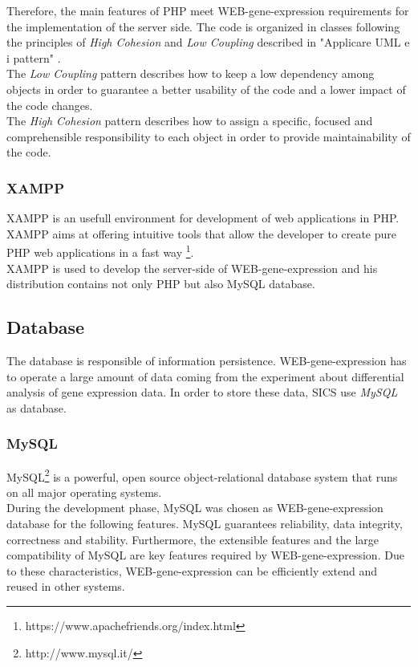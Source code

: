 \documentclass[a4paper]{report}
\begin{document}
Therefore, the main features of PHP meet WEB-gene-expression requirements for the implementation of the server side. The code is organized in classes following the principles of \emph{High Cohesion} and \emph{Low Coupling} described in "Applicare UML e i pattern" \cite{Craig Larman, Luca Cabibbo} . \\
The \emph{Low Coupling} pattern describes how to keep a low dependency among objects in order to guarantee a better usability of the code and a lower impact of the code changes.\\
The \emph{High Cohesion} pattern describes how to assign a specific, focused and comprehensible responsibility to each object in order to provide maintainability of the code.\\

\subsubsection{XAMPP}

XAMPP is an usefull environment for development of web applications in PHP. XAMPP aims at offering intuitive tools that allow the developer to create pure PHP web applications in a fast way \footnote{https://www.apachefriends.org/index.html}.\\
XAMPP is used to develop the server-side of WEB-gene-expression and his distribution contains not only PHP but also MySQL database.

\subsection{Database}

The database is responsible of information persistence. WEB-gene-expression has to operate a large amount of data coming from the experiment about differential analysis of gene expression data. In order to store these data, SICS use \emph{MySQL} as database.

\subsubsection{MySQL}

MySQL\footnote{http://www.mysql.it/} is a powerful, open source object-relational database system that runs on all major operating systems.
\\During the development phase, MySQL was chosen as WEB-gene-expression database for the following features. MySQL guarantees reliability, data integrity, correctness and stability. Furthermore, the extensible features and the large compatibility of MySQL are key features required by WEB-gene-expression. Due to these characteristics, WEB-gene-expression can be efficiently extend and reused in other systems.
\end{document}
